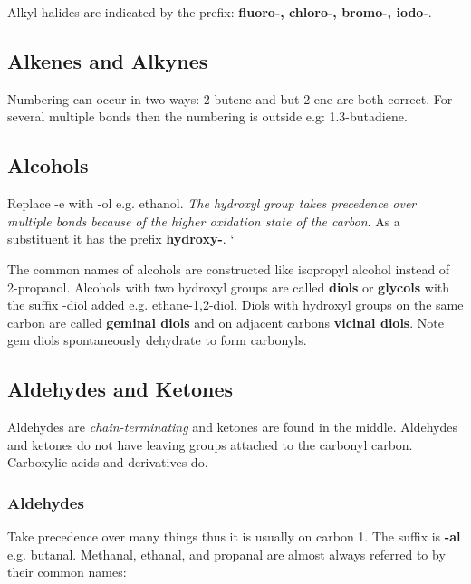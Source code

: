 \documentclass[../OChemReview.tex]{subfiles}
\begin{document}
	Alkyl halides are indicated by the prefix: \textbf{fluoro-, chloro-, bromo-, iodo-}.
	
	\subsection{Alkenes and Alkynes\supdag}
	
	Numbering can occur in two ways: 2-butene and but-2-ene are both correct. For several multiple bonds then the numbering is outside e.g: 1.3-butadiene.
	
	\subsection{Alcohols\supdag}
	
	Replace -e with -ol e.g. ethanol. \emph{The hydroxyl group takes precedence over multiple bonds because of the higher oxidation state of the carbon}. As a substituent it has the prefix \textbf{hydroxy-}.
	\newpage`
	\begin{figure}[h]
		\centering
	\end{figure}
	
	The common names of alcohols are constructed like isopropyl alcohol instead of 2-propanol. Alcohols with two hydroxyl groups are called \textbf{diols} or \textbf{glycols} with the suffix -diol added e.g. ethane-1,2-diol. Diols with hydroxyl groups on the same carbon are called \textbf{geminal diols} and on adjacent carbons \textbf{vicinal diols}. Note gem diols spontaneously dehydrate to form carbonyls.
	
	\subsection{Aldehydes and Ketones\supdag}
	
	Aldehydes are \emph{chain-terminating} and ketones are found in the middle. Aldehydes and ketones do not have leaving groups attached to the carbonyl carbon. Carboxylic acids and derivatives do.
	
	\subsubsection{Aldehydes\supdag}
	
	Take precedence over many things thus it is usually on carbon 1. The suffix is \textbf{-al} e.g. butanal. Methanal, ethanal, and propanal are almost always referred to by their common names:
	
\end{document}
